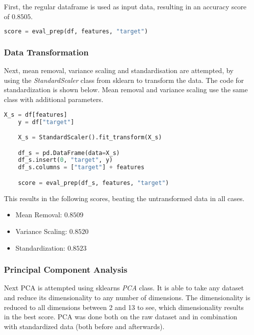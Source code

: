 First, the regular dataframe is used as input data, resulting in an accuracy score of $0.8505$.

\begin{lstlisting}[language=Python]
    score = eval_prep(df, features, "target")
\end{lstlisting}

\subsubsection{Data Transformation}

Next, mean removal, variance scaling and standardisation are attempted, by using the \emph{StandardScaler}
class from sklearn to transform the data. The code for standardization is shown below.
Mean removal and variance scaling use the same class with additional parameters.

\begin{lstlisting}[language=Python]
    X_s = df[features]
    y = df["target"]

    X_s = StandardScaler().fit_transform(X_s)

    df_s = pd.DataFrame(data=X_s)
    df_s.insert(0, "target", y)
    df_s.columns = ["target"] + features

    score = eval_prep(df_s, features, "target")
\end{lstlisting}

This results in the following scores, beating the untransformed data in all cases.

\begin{itemize}
    \item Mean Removal: $0.8509$
    \item Variance Scaling: $0.8520$
    \item Standardization: $0.8523$
\end{itemize}

\subsubsection{Principal Component Analysis}

Next \ac{PCA} is attempted using sklearns \emph{PCA} class. It is able to take any dataset and reduce
its dimensionality to any number of dimensions. The dimensionality is reduced to all dimensions
between 2 and 13 to see, which dimensionality results in the best score.
\ac{PCA} was done both on the raw dataset and in combination with standardized data (both before and afterwards).

